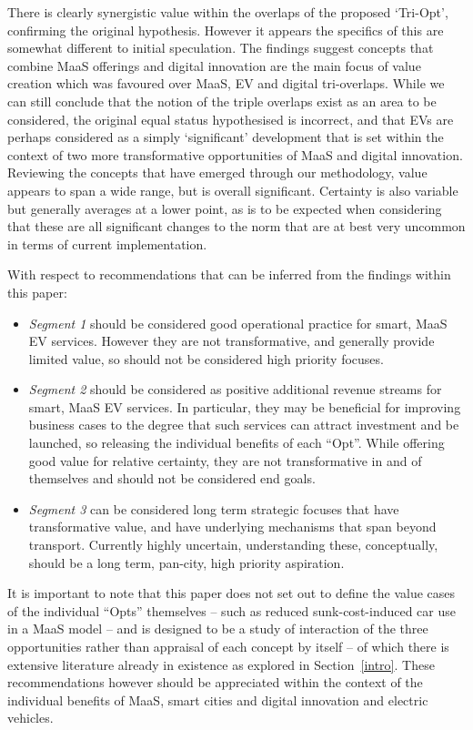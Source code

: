 \documentclass[b5paper,10pt]{article}
\begin{document}
There is clearly synergistic value within the overlaps of the proposed
`Tri-Opt', confirming the original hypothesis. However it appears the
specifics of this are somewhat different to initial speculation. The
findings suggest concepts that combine MaaS offerings and digital
innovation are the main focus of value creation which was favoured
over MaaS, EV and digital tri-overlaps. While we can still conclude
that the notion of the triple overlaps exist as an area to be
considered, the original equal status hypothesised is incorrect, and
that EVs are perhaps considered as a simply `significant' development
that is set within the context of two more transformative
opportunities of MaaS and digital innovation. Reviewing the concepts
that have emerged through our methodology, value appears to span a
wide range, but is overall significant. Certainty is also variable but
generally averages at a lower point, as is to be expected when
considering that these are all significant changes to the norm that
are at best very uncommon in terms of current implementation.

With respect to recommendations that can be inferred from the findings
within this paper:

\begin{itemize}
\item {\emph{Segment 1}} should be considered good operational
practice for smart, MaaS EV services. However they are not
transformative, and generally provide limited value, so should not be
considered high priority focuses.
\item {\emph{Segment 2}} should be considered as positive additional
revenue streams for smart, MaaS EV services. In particular, they may
be beneficial for improving business cases to the degree that such
services can attract investment and be launched, so releasing the
individual benefits of each ``Opt''. While offering good value for
relative certainty, they are not transformative in and of themselves
and should not be considered end goals.
\item {\emph{Segment 3}} can be considered long term strategic focuses
that have transformative value, and have underlying mechanisms that
span beyond transport. Currently highly uncertain, understanding
these, conceptually, should be a long term, pan-city, high priority
  aspiration.
\end{itemize}

It is important to note that this paper does not set out to define the
value cases of the individual ``Opts'' themselves -- such as reduced
sunk-cost-induced car use in a MaaS model -- and is designed to be a
study of interaction of the three opportunities rather than appraisal
of each concept by itself -- of which there is extensive literature
already in existence as explored in Section~\ref{intro}. These
recommendations however should be appreciated within the context of
the individual benefits of MaaS, smart cities and digital innovation
and electric vehicles.
\end{document}
